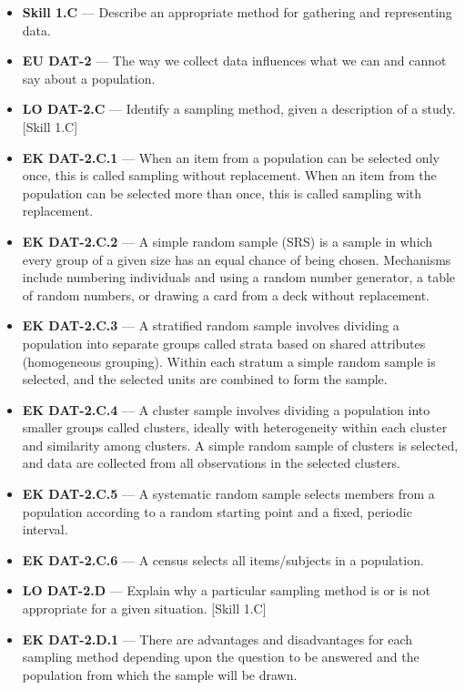 \documentclass[11pt]{article}
\begin{document}


{\small
\begin{itemize}[leftmargin=1.5em,itemsep=2pt,topsep=2pt]
  \item \textbf{Skill 1.C} --- Describe an appropriate method for gathering and representing data.
  \item \textbf{EU DAT-2} --- The way we collect data influences what we can and cannot say about a population.
  \item \textbf{LO DAT-2.C} --- Identify a sampling method, given a description of a study. [Skill 1.C]
  \item \textbf{EK DAT-2.C.1} --- When an item from a population can be selected only once, this is called sampling without replacement. When an item from the population can be selected more than once, this is called sampling with replacement.
  \item \textbf{EK DAT-2.C.2} --- A simple random sample (SRS) is a sample in which every group of a given size has an equal chance of being chosen. Mechanisms include numbering individuals and using a random number generator, a table of random numbers, or drawing a card from a deck without replacement.
  \item \textbf{EK DAT-2.C.3} --- A stratified random sample involves dividing a population into separate groups called strata based on shared attributes (homogeneous grouping). Within each stratum a simple random sample is selected, and the selected units are combined to form the sample.
  \item \textbf{EK DAT-2.C.4} --- A cluster sample involves dividing a population into smaller groups called clusters, ideally with heterogeneity within each cluster and similarity among clusters. A simple random sample of clusters is selected, and data are collected from all observations in the selected clusters.
  \item \textbf{EK DAT-2.C.5} --- A systematic random sample selects members from a population according to a random starting point and a fixed, periodic interval.
  \item \textbf{EK DAT-2.C.6} --- A census selects all items/subjects in a population.
  \item \textbf{LO DAT-2.D} --- Explain why a particular sampling method is or is not appropriate for a given situation. [Skill 1.C]
  \item \textbf{EK DAT-2.D.1} --- There are advantages and disadvantages for each sampling method depending upon the question to be answered and the population from which the sample will be drawn.
\end{itemize}
}
\end{document}
